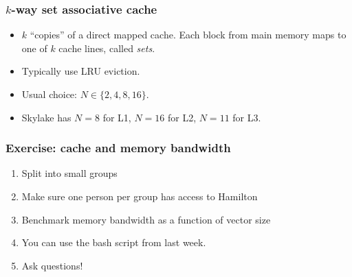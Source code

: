 \documentclass[dvipsnames,presentation,aspectratio=169,14pt]{beamer}
\begin{document}
\begin{frame}
  \frametitle{$k$-way set associative cache}
    \begin{itemize}[itemsep=8pt]
    \item $k$ ``copies'' of a direct mapped cache.  Each block from main
      memory maps to one of $k$ cache lines, called \emph{sets}.
    \item Typically use LRU eviction.
    \item Usual choice: $N \in \{2, 4, 8, 16\}$.
    \item Skylake has $N = 8$ for L1, $N = 16$ for L2, $N = 11$
      for L3.
    \end{itemize}
\end{frame}

\begin{frame}
  \frametitle{Exercise: cache and memory bandwidth}
  \begin{enumerate}[itemsep=8pt]
    \item Split into small groups
    \item Make sure one person per group has access to Hamilton
    \item Benchmark memory bandwidth as a function of vector size
    \item You can use the bash script from last week.
    \item Ask questions!
    \end{enumerate}
  \end{frame}
\end{document}
